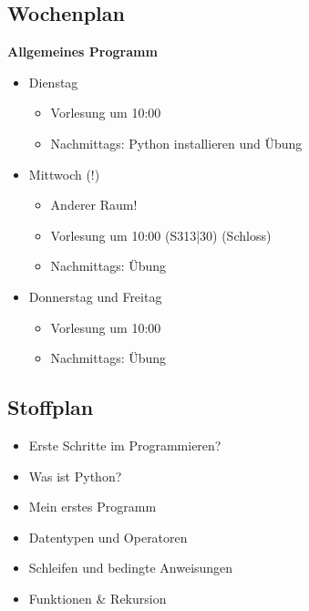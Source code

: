 \subsection{Wochenplan}
\begin{frame}
    \slidehead
    \textbf{Allgemeines Programm}
    \begin{itemize}
        \item Dienstag
            \begin{itemize}
                \item Vorlesung um 10:00
                \item Nachmittags: Python installieren und Übung
            \end{itemize}
            \pause
        \item Mittwoch (!)
            \begin{itemize}
                \item Anderer Raum!
                \item Vorlesung um 10:00 (S313|30) (Schloss)
                \item Nachmittags: Übung
            \end{itemize}
            \pause
        \item Donnerstag und Freitag
            \begin{itemize}
                \item Vorlesung um 10:00
                \item Nachmittags: Übung
            \end{itemize}
    \end{itemize}
\end{frame}

\subsection{Stoffplan}
\begin{frame}
    \slidehead
    \begin{itemize}
        \item Erste Schritte im Programmieren?
        \item Was ist Python?
        \item Mein erstes Programm
        \item Datentypen und Operatoren
        \item Schleifen und bedingte Anweisungen
        \item Funktionen \& Rekursion
    \end{itemize}
\end{frame}

